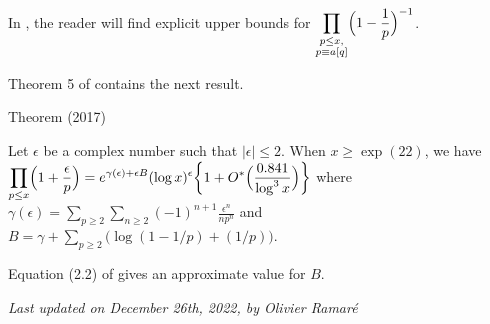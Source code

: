 In \cite{Bordelles*05},
the reader will find explicit upper bounds for $\displaystyle
\prod_{\substack{p\le x,\\ p\equiv a[q]}}\Bigl(1-\frac{1}{p}\Bigr)^{-1}$.
\par 
Theorem 5 of
\cite{Vanlalnagaia*15-1}
contains the next result.
\par 
\begin{thm}{Theorem (2017)}

  Let $\epsilon$ be a complex number such that $|\epsilon|\le 2$. When
  $x\ge\exp(22)$, we have
  $\displaystyle\prod_{p\le x}\Bigl(1+\frac{\epsilon}{p}\Bigr)
  =e^{\gamma(\epsilon)+\epsilon B}(\log x)^\epsilon
  \biggl\{1+O^*\Bigl(\frac{0.841}{\log^3x}\Bigr)\biggr\}$
  where
  $\displaystyle\gamma(\epsilon)=\sum_{p\ge2}\sum_{n\ge2}(-1)^{n+1}\frac{\epsilon^n}{np^n}$
  and
  $\displaystyle B=\gamma+\sum_{p\ge2}\bigl(\log(1-1/p)+(1/p)\bigr)$.
\end{thm}

Equation (2.2) of
\cite{Rosser-Schoenfeld*62}
gives an approximate value for $B$.










  
\begin{flushright}\small\sl{}   Last updated on December 26th, 2022, by Olivier Ramar\'e
 \end{flushright}















